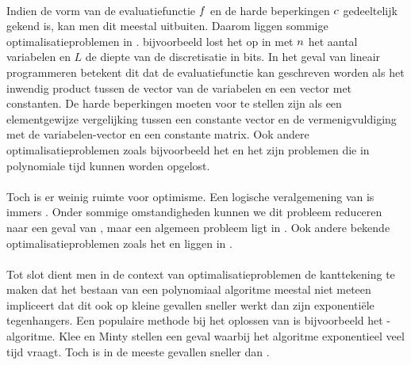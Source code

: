 \paragraph{}
Indien de vorm van de evaluatiefunctie $f$ en de harde beperkingen $c$ gedeeltelijk gekend is, kan men dit meestal uitbuiten. Daarom liggen sommige optimalisatieproblemen in . \cite{linearProgrammingInP} bijvoorbeeld lost het  op in  met $n$ het aantal variabelen en $L$ de diepte van de discretisatie in bits. In het geval van lineair programmeren betekent dit dat de evaluatiefunctie kan geschreven worden als het inwendig product tussen de vector van de variabelen en een vector met constanten. De harde beperkingen moeten voor te stellen zijn als een elementgewijze vergelijking tussen een constante vector en de vermenigvuldiging met de variabelen-vector en een constante matrix. Ook andere optimalisatieproblemen zoals bijvoorbeeld het  en het  zijn problemen die in polynomiale tijd kunnen worden opgelost.

\paragraph{}
Toch is er weinig ruimte voor optimisme. Een logische veralgemening van  is immers . Onder sommige omstandigheden kunnen we dit probleem reduceren\cite{Kozlov1980223} naar een geval van , maar een algemeen  probleem ligt in \cite{qpInNP}. Ook andere bekende optimalisatieproblemen zoals het  en  liggen in .

\paragraph{}
Tot slot dient men in de context van optimalisatieproblemen de kanttekening te maken dat het bestaan van een polynomiaal algoritme meestal niet meteen impliceert dat dit ook op kleine gevallen sneller werkt dan zijn exponenti\"ele tegenhangers. Een populaire methode bij het oplossen van  is bijvoorbeeld het -algoritme. Klee en Minty\cite{klee:1972} stellen een geval waarbij het algoritme exponentieel veel tijd vraagt. Toch is  in de meeste gevallen sneller dan .